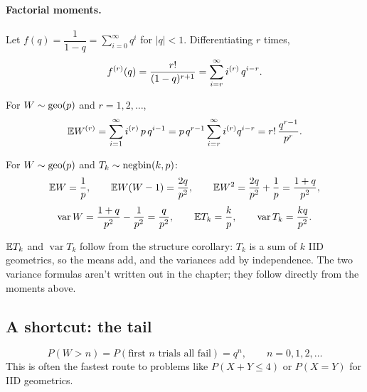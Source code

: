 \paragraph{Factorial moments.}
Let $f(q) = \dfrac{1}{1-q} = \displaystyle\sum_{i=0}^{\infty} q^i$ for $|q| < 1$. Differentiating $r$ times,
\[
f^{(r)}(q) = \frac{r!}{(1-q)^{r+1}} = \sum_{i=r}^{\infty} i^{(r)}\, q^{i-r}.
\]

\begin{proposition}
For $W \sim \operatorname{geo}(p)$ and $r = 1, 2, \dots$,
\[
\mathbb{E} W^{(r)} = \sum_{i=1}^{\infty} i^{(r)}\, p\, q^{i-1} = p\,q^{r-1} \sum_{i=r}^{\infty} i^{(r)} q^{i-r} = r!\,\frac{q^{r-1}}{p^r}.
\]
\end{proposition}

\begin{corollary}[Summary]
For $W \sim \operatorname{geo}(p)$ and $T_k \sim \operatorname{negbin}(k,p)$:
\[
\mathbb{E} W = \frac1p, \qquad
\mathbb{E} W(W-1) = \frac{2q}{p^2}, \qquad
\mathbb{E} W^2 = \frac{2q}{p^2} + \frac1p = \frac{1+q}{p^2},
\]
\[
\operatorname{var} W = \frac{1+q}{p^2} - \frac{1}{p^2} = \frac{q}{p^2}, \qquad
\mathbb{E} T_k = \frac{k}{p}, \qquad
\operatorname{var} T_k = \frac{kq}{p^2}.
\]
\end{corollary}
\begin{remark}
$\mathbb{E} T_k$ and $\operatorname{var} T_k$ follow from the structure corollary: $T_k$ is a sum of $k$ IID geometrics, so the means add, and the variances add by independence. The two variance formulas aren't written out in the chapter; they follow directly from the moments above.
\end{remark}

\subsection{A shortcut: the tail}

\[
P(W > n) = P(\text{first } n \text{ trials all fail}) = q^n, \qquad n = 0,1,2,\dots
\]
This is often the fastest route to problems like $P(X + Y \le 4)$ or $P(X = Y)$ for IID geometrics.
